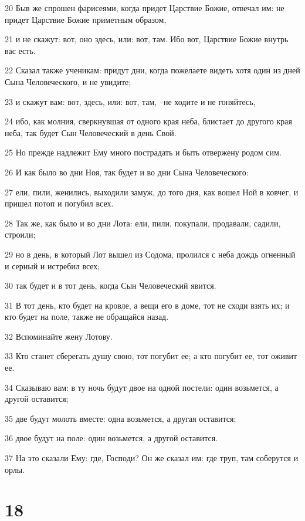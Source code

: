\par 20 Быв же спрошен фарисеями, когда придет Царствие Божие, отвечал им: не придет Царствие Божие приметным образом,
\par 21 и не скажут: вот, оно здесь, или: вот, там. Ибо вот, Царствие Божие внутрь вас есть.
\par 22 Сказал также ученикам: придут дни, когда пожелаете видеть хотя один из дней Сына Человеческого, и не увидите;
\par 23 и скажут вам: вот, здесь, или: вот, там, --не ходите и не гоняйтесь,
\par 24 ибо, как молния, сверкнувшая от одного края неба, блистает до другого края неба, так будет Сын Человеческий в день Свой.
\par 25 Но прежде надлежит Ему много пострадать и быть отвержену родом сим.
\par 26 И как было во дни Ноя, так будет и во дни Сына Человеческого:
\par 27 ели, пили, женились, выходили замуж, до того дня, как вошел Ной в ковчег, и пришел потоп и погубил всех.
\par 28 Так же, как было и во дни Лота: ели, пили, покупали, продавали, садили, строили;
\par 29 но в день, в который Лот вышел из Содома, пролился с неба дождь огненный и серный и истребил всех;
\par 30 так будет и в тот день, когда Сын Человеческий явится.
\par 31 В тот день, кто будет на кровле, а вещи его в доме, тот не сходи взять их; и кто будет на поле, также не обращайся назад.
\par 32 Вспоминайте жену Лотову.
\par 33 Кто станет сберегать душу свою, тот погубит ее; а кто погубит ее, тот оживит ее.
\par 34 Сказываю вам: в ту ночь будут двое на одной постели: один возьмется, а другой оставится;
\par 35 две будут молоть вместе: одна возьмется, а другая оставится;
\par 36 двое будут на поле: один возьмется, а другой оставится.
\par 37 На это сказали Ему: где, Господи? Он же сказал им: где труп, там соберутся и орлы.

\chapter{18}

